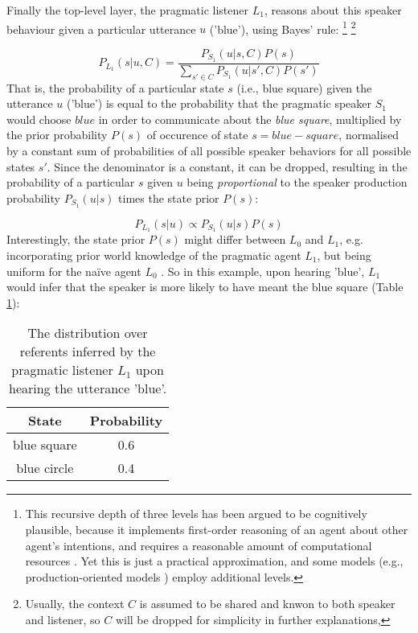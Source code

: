 Finally the top-level layer, the pragmatic listener $L_1$, reasons about this speaker behaviour given a particular utterance $u$ ('blue'), using Bayes' rule: \footnote{This recursive depth of three levels has been argued to be cognitively plausible, because it implements first-order reasoning of an agent about other agent's intentions, and requires a reasonable amount of computational resources \parencite{frank2012predicting}. Yet this is just a practical approximation, and some models (e.g., production-oriented models ) employ additional levels.\parencite{problang}} \footnote{Usually, the context $C$ is assumed to be shared and knwon to both speaker and listener, so $C$ will be dropped for simplicity in further explanations, }
 
$$P_{L_1}(s | u, C) = \frac{P_{S_1}(u | s, C) P(s)}{\sum_{s' \in C} P_{S_1}(u | s', C) P(s')}$$
That is, the probability of a particular state $s$ (i.e., blue square) given the utterance $u$ ('blue') is equal to the probability that the pragmatic speaker $S_1$ would choose $blue$ in order to communicate about the \textit{blue square}, multiplied by the prior probability $P(s)$ of occurence of state $s = blue-square$, normalised by a constant sum of probabilities of all possible speaker behaviors for all possible states $s'$. Since the denominator is a constant, it can be dropped, resulting in the probability of a particular $s$ given $u$ being \emph{proportional} to the speaker production probability $P_{S_1}(u | s)$ times the state prior $P(s)$:

$$P_{L_1}(s | u) \propto P_{S_1}(u | s) P(s)$$ 
Interestingly, the state prior $P(s)$ might differ between $L_0$ and $L_1$, e.g. incorporating prior world knowledge of the pragmatic agent $L_1$, but being uniform for the na\"ive agent $L_0$ \parencite{problang}. So in this example, upon hearing 'blue', $L_1$ would infer that the speaker is more likely to have meant the blue square (Table \ref{rsa-l1}):

\begin{table}[h]
	\begin{center}
		\caption{The distribution over referents inferred by the pragmatic listener $L_1$ upon hearing the utterance 'blue'.}
		\label{rsa-l1}
		\vskip 0.12in
		\begin{tabular}{cc}
			State & Probability \\
			\hline
			blue square & 0.6 \\
			blue circle & 0.4
		\end{tabular}
	\end{center}
\end{table}

